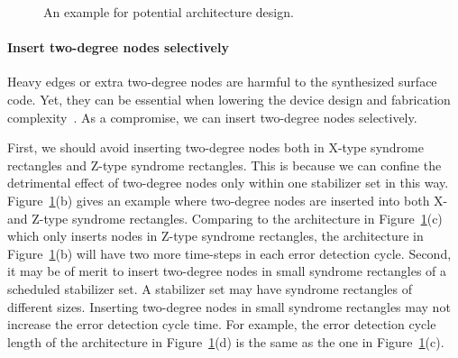 \begin{figure}
    \centering
    \caption{An example for potential architecture design. }
    \label{fig:arch_implict}
\end{figure}

\paragraph{Insert two-degree nodes selectively}
Heavy edges or extra two-degree nodes are harmful to the synthesized surface code. Yet, they can be essential when lowering the device design and fabrication complexity~\cite{Li2020TowardsES}.
As a compromise, we can insert two-degree nodes selectively.

First, we should avoid inserting two-degree nodes both in X-type syndrome rectangles and Z-type syndrome rectangles. This is because we can confine the detrimental effect of two-degree nodes only within one stabilizer set in this way.  Figure~\ref{fig:arch_implict}(b) gives an example where two-degree nodes are inserted into both X- and Z-type syndrome rectangles. Comparing to the architecture in Figure~\ref{fig:arch_implict}(c) which only inserts nodes in Z-type syndrome rectangles, the architecture in Figure~\ref{fig:arch_implict}(b) will have two more time-steps in each error detection cycle. 
Second, it may be of merit to insert two-degree nodes in small syndrome rectangles of a scheduled stabilizer set.
A stabilizer set may have syndrome rectangles of different sizes. Inserting two-degree nodes in small syndrome rectangles may not increase the error detection cycle time. For example, the error detection cycle length of the architecture in Figure~\ref{fig:arch_implict}(d) is the same as the one in Figure~\ref{fig:arch_implict}(c).



